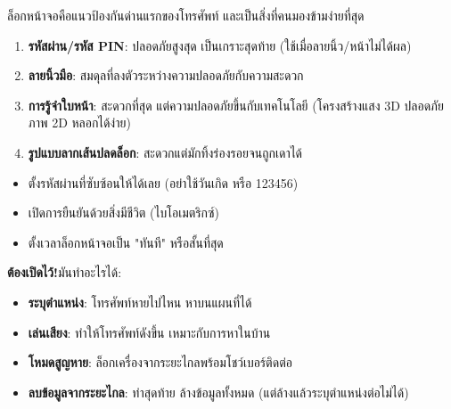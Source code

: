 


ล็อกหน้าจอคือแนวป้องกันด่านแรกของโทรศัพท์ และเป็นสิ่งที่คนมองข้ามง่ายที่สุด


\begin{enumerate}
  \item \textbf{รหัสผ่าน/รหัส PIN}: ปลอดภัยสูงสุด เป็นเกราะสุดท้าย (ใช้เมื่อลายนิ้ว/หน้าไม่ได้ผล)
  \item \textbf{ลายนิ้วมือ}: สมดุลที่ลงตัวระหว่างความปลอดภัยกับความสะดวก
  \item \textbf{การรู้จำใบหน้า}: สะดวกที่สุด แต่ความปลอดภัยขึ้นกับเทคโนโลยี (โครงสร้างแสง 3D ปลอดภัย ภาพ 2D หลอกได้ง่าย)
  \item \textbf{รูปแบบลากเส้นปลดล็อก}: สะดวกแต่มักทิ้งร่องรอยจนถูกเดาได้
\end{enumerate}


\begin{itemize}
  \item ตั้งรหัสผ่านที่ซับซ้อนให้ได้เลย (อย่าใช้วันเกิด หรือ 123456)
  \item เปิดการยืนยันด้วยสิ่งมีชีวิต (ไบโอเมตริกซ์)
  \item ตั้งเวลาล็อกหน้าจอเป็น "ทันที" หรือสั้นที่สุด
\end{itemize}


\textbf{ต้องเปิดไว้!}มันทำอะไรได้:

\begin{itemize}
  \item \textbf{ระบุตำแหน่ง}: โทรศัพท์หายไปไหน หาบนแผนที่ได้
  \item \textbf{เล่นเสียง}: ทำให้โทรศัพท์ดังขึ้น เหมาะกับการหาในบ้าน
  \item \textbf{โหมดสูญหาย}: ล็อกเครื่องจากระยะไกลพร้อมโชว์เบอร์ติดต่อ
  \item \textbf{ลบข้อมูลจากระยะไกล}: ท่าสุดท้าย ล้างข้อมูลทั้งหมด (แต่ล้างแล้วระบุตำแหน่งต่อไม่ได้)
\end{itemize}

